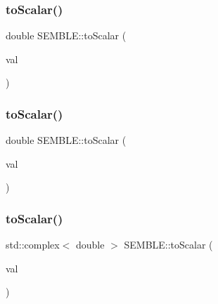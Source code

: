 \mbox{\label{namespaceSEMBLE_a0642469606d582b54e84fafac3673ea5}} 
\subsubsection{\texorpdfstring{toScalar()}{toScalar()}\hspace{0.1cm}{\footnotesize\ttfamily [3/6]}}
{\footnotesize\ttfamily double S\+E\+M\+B\+L\+E\+::to\+Scalar (\begin{DoxyParamCaption}\item[{const Real}]{val }\end{DoxyParamCaption})\hspace{0.3cm}{\ttfamily [inline]}}

\mbox{\label{namespaceSEMBLE_a947496ec866f5b368db8503e3be29388}} 
\subsubsection{\texorpdfstring{toScalar()}{toScalar()}\hspace{0.1cm}{\footnotesize\ttfamily [4/6]}}
{\footnotesize\ttfamily double S\+E\+M\+B\+L\+E\+::to\+Scalar (\begin{DoxyParamCaption}\item[{const O\+Scalar$<$ P\+Scalar$<$ P\+Scalar$<$ R\+Scalar$<$ R\+E\+AL $>$ $>$ $>$ $>$}]{val }\end{DoxyParamCaption})\hspace{0.3cm}{\ttfamily [inline]}}

\mbox{\label{namespaceSEMBLE_af07f798289a04210dff858088b3b08d8}} 
\subsubsection{\texorpdfstring{toScalar()}{toScalar()}\hspace{0.1cm}{\footnotesize\ttfamily [5/6]}}
{\footnotesize\ttfamily std\+::complex$<$ double $>$ S\+E\+M\+B\+L\+E\+::to\+Scalar (\begin{DoxyParamCaption}\item[{const O\+Scalar$<$ P\+Scalar$<$ P\+Scalar$<$ R\+Complex$<$ R\+E\+AL $>$ $>$ $>$ $>$}]{val }\end{DoxyParamCaption})\hspace{0.3cm}{\ttfamily [inline]}}


